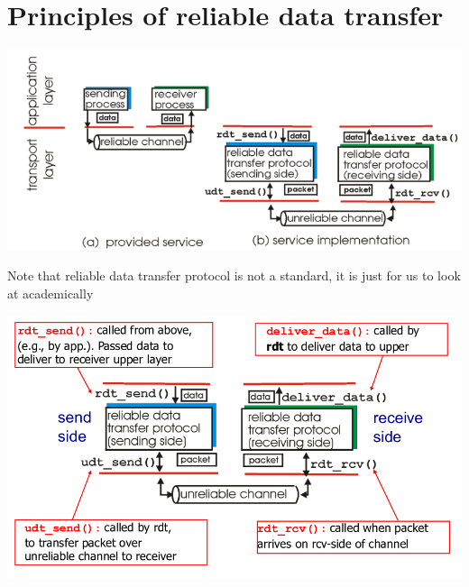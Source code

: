\documentclass{article}[18pt]
\begin{document}
\section{Principles of reliable data transfer}
\begin{center}
	\includegraphics[scale=0.7]{"reliable data transfer"}
\end{center}
Note that reliable data transfer protocol is not a standard, it is just for us to look at academically
\begin{center}
	\includegraphics[scale=0.7]{"reliable data transfer1"}
\end{center}
\end{document}
